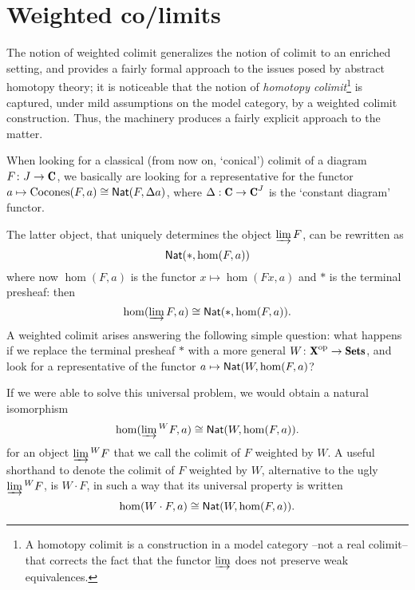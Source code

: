 \documentclass[a4paper,12pt]{amsart}
\begin{document}
\section{Weighted co/limits}
The notion of weighted colimit generalizes the notion of colimit to an enriched setting, and provides a fairly formal approach to the issues posed by abstract homotopy theory; it is noticeable that the notion of \emph{homotopy colimit}\footnote{A homotopy colimit is a construction in a model category --not a real colimit-- that corrects the fact that the functor $\varinjlim$ does not preserve weak equivalences.} is captured, under mild assumptions on the model category, by a weighted colimit construction. Thus, the machinery produces a fairly explicit approach to the matter.

When looking for a classical (from now on, `conical') colimit of a diagram $F\colon J \to \C$, we basically are looking for a representative for the functor $a\mapsto \text{Cocones}(F,a)\cong \textsf{Nat}(F,\Delta a)$, where $\Delta : \C \to \C^J$ is the `constant diagram' functor.

The latter object, that uniquely determines the object $\varinjlim F$, can be rewritten as
\[
\textsf{Nat}(*, \hom(F,a))
\]
where now $\hom(F,a)$ is the functor $x\mapsto \hom(Fx,a)$ and $*$ is the terminal presheaf: then
\[
\hom(\varinjlim F,a)\cong \textsf{Nat}(*, \hom(F,a)).
\]
A weighted colimit arises answering the following simple question: what happens if we replace the terminal presheaf $*$ with a more general $W\colon \cate{X}^\opp\to \Sets$, and look for a representative of the functor $a\mapsto \textsf{Nat}(W, \hom(F,a)$? 

If we were able to solve this universal problem, we would obtain a natural isomorphism
\[
\hom(\varinjlim{}^W F,a)\cong \textsf{Nat}(W, \hom(F,a)).
\]
for an object $\varinjlim{}^W F$ that we call the colimit of $F$ weighted by $W$. A useful shorthand to denote the colimit of $F$ weighted by $W$, alternative to the ugly $\varinjlim{}^W F$, is $W\cdot F$, in such a way that its universal property is written
\[
\hom(W\cdot F,a)\cong \textsf{Nat}(W, \hom(F,a)).
\]
\end{document}
